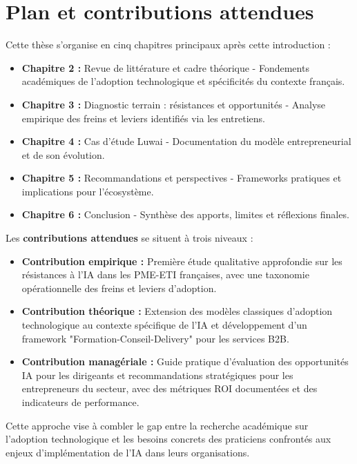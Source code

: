 \section{Plan et contributions attendues}

Cette thèse s'organise en cinq chapitres principaux après cette introduction :
\bigskip
\begin{itemize}
    \item \textbf{Chapitre 2 :} Revue de littérature et cadre théorique - Fondements académiques de l'adoption technologique et spécificités du contexte français.
    \item \textbf{Chapitre 3 :} Diagnostic terrain : résistances et opportunités - Analyse empirique des freins et leviers identifiés via les entretiens.
    \item \textbf{Chapitre 4 :} Cas d'étude Luwai - Documentation du modèle entrepreneurial et de son évolution.
    \item \textbf{Chapitre 5 :} Recommandations et perspectives - Frameworks pratiques et implications pour l'écosystème.
    \item \textbf{Chapitre 6 :} Conclusion - Synthèse des apports, limites et réflexions finales.
\end{itemize}
\newpage
Les \textbf{contributions attendues} se situent à trois niveaux :
\bigskip
\begin{itemize}
    \item \textbf{Contribution empirique :} Première étude qualitative approfondie sur les résistances à l'IA dans les PME-ETI françaises, avec une taxonomie opérationnelle des freins et leviers d'adoption.
    \item \textbf{Contribution théorique :} Extension des modèles classiques d'adoption technologique au contexte spécifique de l'IA et développement d'un framework "Formation-Conseil-Delivery" pour les services B2B.
    \item \textbf{Contribution managériale :} Guide pratique d'évaluation des opportunités IA pour les dirigeants et recommandations stratégiques pour les entrepreneurs du secteur, avec des métriques ROI documentées et des indicateurs de performance.
\end{itemize}
\medskip
Cette approche vise à combler le gap entre la recherche académique sur l'adoption technologique et les besoins concrets des praticiens confrontés aux enjeux d'implémentation de l'IA dans leurs organisations.
